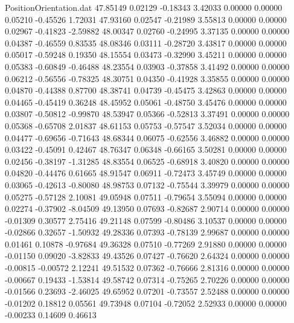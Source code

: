 \begin{filecontents}{PositionOrientation.dat}
  47.85149    0.02129   -0.18343     3.42033    0.00000    0.00000    0.05210   -0.45526    1.72031
  47.93160    0.02547   -0.21989     3.55813    0.00000    0.00000    0.02967   -0.41823   -2.59882
  48.00347    0.02760   -0.24995     3.37135    0.00000    0.00000    0.04387   -0.46559    0.83535
  48.08346    0.03111   -0.28720     3.43817    0.00000    0.00000    0.05017   -0.59248    0.19350
  48.15554    0.03473   -0.32990     3.45211    0.00000    0.00000    0.05383   -0.60849   -0.46488
  48.23554    0.03903   -0.37858     3.41492    0.00000    0.00000    0.06212   -0.56556   -0.78325
  48.30751    0.04350   -0.41928     3.35855    0.00000    0.00000    0.04870   -0.44388    0.87700
  48.38741    0.04739   -0.45475     3.42863    0.00000    0.00000    0.04465   -0.45419    0.36248
  48.45952    0.05061   -0.48750     3.45476    0.00000    0.00000    0.03807   -0.50812   -0.99870
  48.53947    0.05366   -0.52813     3.37491    0.00000    0.00000    0.05368   -0.65708    2.01837
  48.61153    0.05753   -0.57547     3.52034    0.00000    0.00000    0.04477   -0.69656   -0.71643
  48.68344    0.06075   -0.62556     3.46882    0.00000    0.00000    0.03422   -0.45091    0.42467
  48.76347    0.06348   -0.66165     3.50281    0.00000    0.00000    0.02456   -0.38197   -1.31285
  48.83554    0.06525   -0.68918     3.40820    0.00000    0.00000    0.04820   -0.44476    0.61665
  48.91547    0.06911   -0.72473     3.45749    0.00000    0.00000    0.03065   -0.42613   -0.80080
  48.98753    0.07132   -0.75544     3.39979    0.00000    0.00000    0.05275   -0.57128    2.10081
  49.05948    0.07511   -0.79654     3.55094    0.00000    0.00000    0.02274   -0.37902   -8.04509
  49.13950    0.07693   -0.82687     2.90714    0.00000    0.00000   -0.01309    0.30577    2.75416
  49.21148    0.07599   -0.80486     3.10537    0.00000    0.00000   -0.02866    0.32657   -1.50932
  49.28336    0.07393   -0.78139     2.99687    0.00000    0.00000    0.01461    0.10878   -0.97684
  49.36328    0.07510   -0.77269     2.91880    0.00000    0.00000   -0.01150    0.09020   -3.82833
  49.43526    0.07427   -0.76620     2.64324    0.00000    0.00000   -0.00815   -0.00572    2.12241
  49.51532    0.07362   -0.76666     2.81316    0.00000    0.00000   -0.00667    0.19433   -1.53814
  49.58742    0.07314   -0.75265     2.70226    0.00000    0.00000   -0.01566    0.23693   -2.46025
  49.65952    0.07201   -0.73557     2.52488    0.00000    0.00000   -0.01202    0.18812    0.05561
  49.73948    0.07104   -0.72052     2.52933    0.00000    0.00000   -0.00233    0.14609    0.46613

\end{filecontents}
